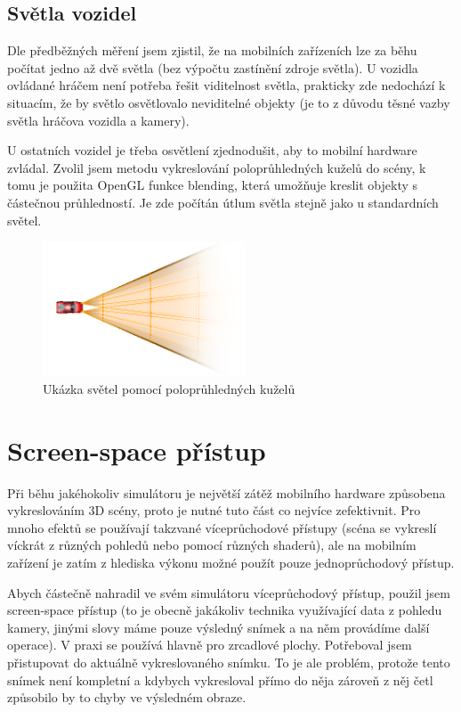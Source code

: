 \documentclass[11pt,twoside,a4paper]{book}
\begin{document}
\subsection{Světla vozidel}

Dle předběžných měření jsem zjistil, že na mobilních zařízeních lze za běhu počítat jedno až dvě světla (bez výpočtu zastínění zdroje světla). U vozidla ovládané hráčem není potřeba řešit viditelnost světla, prakticky zde nedochází k situacím, že by světlo osvětlovalo neviditelné objekty (je to z důvodu těsné vazby světla hráčova vozidla a kamery).

U ostatních vozidel je třeba osvětlení zjednodušit, aby to mobilní hardware zvládal. Zvolil jsem metodu vykreslování poloprůhledných kuželů do scény, k tomu je použita OpenGL funkce blending, která umožňuje kreslit objekty s částečnou průhledností. Je zde počítán útlum světla stejně jako u standardních světel.
\newpage

\begin{center}
\begin{figure}[h]
\includegraphics[width=60mm]{figures/carlight.png}
\caption{Ukázka světel pomocí poloprůhledných kuželů}
\end{figure}
\end{center}

\section{Screen-space přístup}
Při běhu jakéhokoliv simulátoru je největší zátěž mobilního hardware způsobena vykreslováním 3D scény, proto je nutné tuto část co nejvíce zefektivnit. Pro mnoho efektů se používají takzvané víceprůchodové přístupy (scéna se vykreslí víckrát z různých pohledů nebo pomocí různých shaderů), ale na mobilním zařízení je zatím z hlediska výkonu možné použít pouze jednoprůchodový přístup.

Abych částečně nahradil ve svém simulátoru víceprůchodový přístup, použil jsem screen-space přístup (to je obecně jakákoliv technika využívající data z pohledu kamery, jinými slovy máme pouze výsledný snímek a na něm provádíme další operace). V praxi se používá hlavně pro zrcadlové plochy. Potřeboval jsem přistupovat do aktuálně vykreslovaného snímku. To je ale problém, protože tento snímek není kompletní a kdybych vykresloval přímo do něj\linebreak a zároveň z něj četl způsobilo by to chyby ve výsledném obraze.
\end{document}
